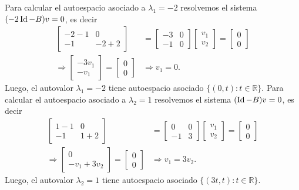 \begin{enumerate}[topsep=6pt,itemsep=.4cm]
    Para calcular el autoespacio asociado a $\lambda_1=-2$ resolvemos el sistema  $(-2\operatorname{Id}-B)v=0$, es decir
    \begin{align*}
        \begin{bmatrix} -2-1 & 0\\ -1 & -2+2 \end{bmatrix} &= \begin{bmatrix} -3 & 0\\ -1 & 0 \end{bmatrix} \begin{bmatrix} v_1\\ v_2 \end{bmatrix} = \begin{bmatrix} 0\\ 0 \end{bmatrix} \\
        \Rightarrow \begin{bmatrix} -3v_1\\ -v_1 \end{bmatrix} = \begin{bmatrix} 0\\ 0 \end{bmatrix} &\Rightarrow v_1=0.
    \end{align*}
    Luego,  el autovalor $\lambda_1=-2$ tiene autoespacio asociado $\{(0,t): t\in\mathbb{R}\}$.
    Para calcular el autoespacio asociado a $\lambda_2=1$ resolvemos el sistema  $(\operatorname{Id}-B)v=0$, es decir
    \begin{align*}
        \begin{bmatrix} 1-1 & 0\\ -1 & 1+2 \end{bmatrix} &= \begin{bmatrix} 0 & 0\\ -1 & 3 \end{bmatrix} \begin{bmatrix} v_1\\ v_2 \end{bmatrix} = \begin{bmatrix} 0\\ 0 \end{bmatrix} \\
        \Rightarrow \begin{bmatrix} 0\\ -v_1+3v_2 \end{bmatrix} = \begin{bmatrix} 0\\ 0 \end{bmatrix} &\Rightarrow v_1=3v_2.
    \end{align*}
    Luego,  el autovalor $\lambda_2=1$ tiene autoespacio asociado $\{(3t,t): t\in\mathbb{R}\}$.
    


\end{enumerate}
